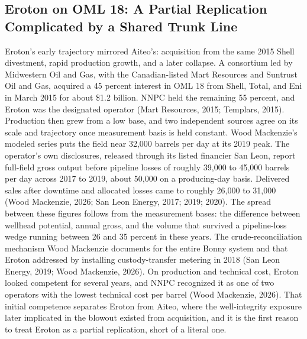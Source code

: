 \documentclass[twoside,fontset=lmodern]{mitthesis}
\begin{document}
\hypertarget{eroton-on-oml-18-a-partial-replication-complicated-by-a-shared-trunk-line}{%
\subsection{Eroton on OML 18: A Partial Replication Complicated by a
Shared Trunk
Line}\label{eroton-on-oml-18-a-partial-replication-complicated-by-a-shared-trunk-line}}

Eroton's early trajectory mirrored Aiteo's: acquisition from the same
2015 Shell divestment, rapid production growth, and a later collapse. A
consortium led by Midwestern Oil and Gas, with the Canadian-listed Mart
Resources and Suntrust Oil and Gas, acquired a 45 percent interest in
OML 18 from Shell, Total, and Eni in March 2015 for about \$1.2 billion.
NNPC held the remaining 55 percent, and Eroton was the designated
operator (Mart Resources, 2015; Templars, 2015). Production then grew
from a low base, and two independent sources agree on its scale and
trajectory once measurement basis is held constant. Wood Mackenzie's
modeled series puts the field near 32,000 barrels per day at its 2019
peak. The operator's own disclosures, released through its listed
financier San Leon, report full-field gross output before pipeline
losses of roughly 39,000 to 45,000 barrels per day across 2017 to 2019,
about 50,000 on a producing-day basis. Delivered sales after downtime
and allocated losses came to roughly 26,000 to 31,000 (Wood Mackenzie,
2026; San Leon Energy, 2017; 2019; 2020). The spread between these
figures follows from the measurement bases: the difference between
wellhead potential, annual gross, and the volume that survived a
pipeline-loss wedge running between 26 and 35 percent in these years.
The crude-reconciliation mechanism Wood Mackenzie documents for the
entire Bonny system and that Eroton addressed by installing
custody-transfer metering in 2018 (San Leon Energy, 2019; Wood
Mackenzie, 2026). On production and technical cost, Eroton looked
competent for several years, and NNPC recognized it as one of two
operators with the lowest technical cost per barrel (Wood Mackenzie,
2026). That initial competence separates Eroton from Aiteo, where the
well-integrity exposure later implicated in the blowout existed from
acquisition, and it is the first reason to treat Eroton as a partial
replication, short of a literal one.
\end{document}
